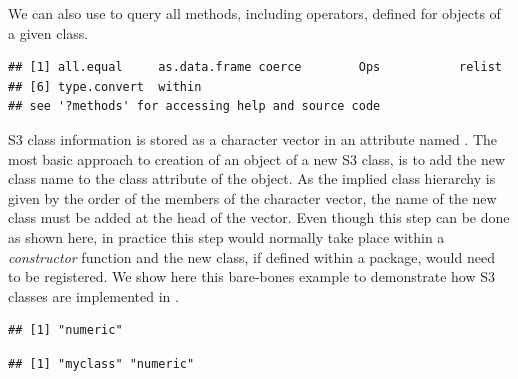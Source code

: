 \documentclass[krantz2]{krantz}\usepackage{knitr}
\begin{document}
We can also use  to query all methods, including operators, defined for objects of a given class.

\begin{knitrout}\footnotesize
{}\color{fgcolor}\begin{kframe}
\begin{alltt}
\hlstd{(} \hlstd{=} \hlstd{)}
\end{alltt}
\begin{verbatim}
## [1] all.equal     as.data.frame coerce        Ops           relist
## [6] type.convert  within
## see '?methods' for accessing help and source code
\end{verbatim}
\end{kframe}
\end{knitrout}

S3 class information is stored as a character vector in an attribute named . The most basic approach to creation of an object of a new S3 class, is to add the new class name to the class attribute of the object. As the implied class hierarchy is given by the order of the members of the character vector, the name of the new class must be added at the head of the vector. Even though this step can be done as shown here, in practice this step would normally take place within a \emph{constructor} function and the new class, if defined within a package, would need to be registered. We show here this bare-bones example to demonstrate how S3 classes are implemented in \Rlang.

\begin{knitrout}\footnotesize
{}\color{fgcolor}\begin{kframe}
\begin{alltt}
 \hlkwb{<-} 
\end{alltt}
\begin{verbatim}
## [1] "numeric"
\end{verbatim}
\begin{alltt}
 \hlkwb{<-} \hlstd{(}\hlstd{,} 
\end{alltt}
\begin{verbatim}
## [1] "myclass" "numeric"
\end{verbatim}
\end{kframe}
\end{knitrout}
\end{document}
